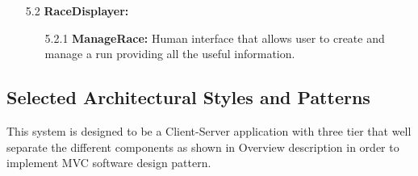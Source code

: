 \begin{enumerate}
\item[5.2] \textbf{RaceDisplayer: }
	\begin{enumerate}
		\item[5.2.1] \textbf{ManageRace: } Human interface that allows user to create and manage a run providing all the useful information.
	\end{enumerate}		

\end{enumerate}




\subsection{Selected Architectural Styles and Patterns}

This system is designed to be a Client-Server application with three tier that well separate the different components as shown in Overview description in order to implement MVC software design pattern.

